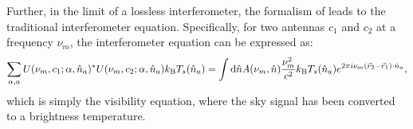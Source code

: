 Further, in the limit of a lossless interferometer, the formalism of \citealt{Venumadhav.16} leads
to the traditional interferometer equation. Specifically, for two antennas $c_1$
and $c_2$ at a frequency $\nu_m$, the interferometer equation can be expressed as:
\begin{equation}
\sum_{\alpha, a} U(\nu_m, c_1; \alpha, \hat{n}_a)^* U(\nu_m, c_2; \alpha, \hat{n}_a) k_\mathrm{B} T_s(\hat{n}_a) =
\int {\rm d}\hat{n} A(\nu_m, \hat{n}) \frac{\nu_m^2}{c^2} k_\mathrm{B} T_s (\hat{n}_a) e^{2\pi i \nu_m (\vec{r}_2 - \vec{r}_1) \cdot \hat{n}_a},
\end{equation}
which is simply the visibility equation, where the sky signal has been converted to a brightness temperature.